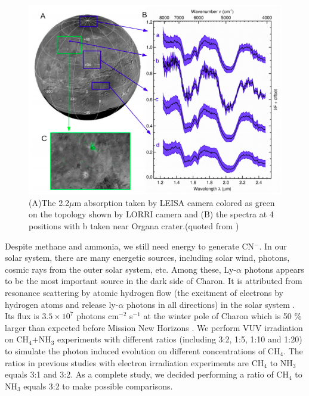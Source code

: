 \begin{figure}
\centering
\includegraphics[width=\textwidth]{figures/chapter1/IR.png}
\caption{(A)The 2.2$\mu$m absorption taken by LEISA camera colored as green on the topology shown by LORRI camera and (B) the spectra at 4 positions with b taken near Organa crater.(quoted from \cite{grundy2016surface})}
\label{fig:Charon_IR}
\end{figure}

Despite methane and ammonia, we still need energy to generate CN$^-$. In our solar system, there are many energetic sources, including solar wind, photons, cosmic rays from the outer solar system, etc. Among these, Ly-$\alpha$ photons appears to be the most important source in the dark side of Charon. It is attributed from resonance scattering by atomic hydrogen flow (the excitment of electrons by hydrogen atoms and release ly-$\alpha$ photons in all directions) in the solar system \cite{grundy2016formation}. Its flux is $3.5 \times 10^7$ photons cm$^{-2}$ s$^{-1}$ at the winter pole of Charon \cite{grundy2016formation} which is 50 \% larger than expected before Mission New Horizons \cite{gladstone2015lyalpha}. We perform VUV irradiation on CH$_4$+NH$_3$ experiments with different ratios (including 3:2, 1:5, 1:10 and 1:20) to simulate the photon induced evolution on different concentrations of CH$_4$. The ratios in previous studies with electron irradiation experiments are CH$_4$ to NH$_3$ equals 3:1\cite{kim} and 3:2\cite{kundu2017electron}. As a complete study, we decided performing a ratio of CH$_4$ to NH$_3$ equals 3:2 to make possible comparisons.

